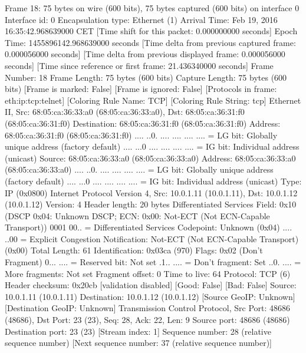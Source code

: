 Frame 18: 75 bytes on wire (600 bits), 75 bytes captured (600 bits) on interface 0
    Interface id: 0
    Encapsulation type: Ethernet (1)
    Arrival Time: Feb 19, 2016 16:35:42.968639000 CET
    [Time shift for this packet: 0.000000000 seconds]
    Epoch Time: 1455896142.968639000 seconds
    [Time delta from previous captured frame: 0.000056000 seconds]
    [Time delta from previous displayed frame: 0.000056000 seconds]
    [Time since reference or first frame: 21.436340000 seconds]
    Frame Number: 18
    Frame Length: 75 bytes (600 bits)
    Capture Length: 75 bytes (600 bits)
    [Frame is marked: False]
    [Frame is ignored: False]
    [Protocols in frame: eth:ip:tcp:telnet]
    [Coloring Rule Name: TCP]
    [Coloring Rule String: tcp]
Ethernet II, Src: 68:05:ca:36:33:a0 (68:05:ca:36:33:a0), Dst: 68:05:ca:36:31:f0 (68:05:ca:36:31:f0)
    Destination: 68:05:ca:36:31:f0 (68:05:ca:36:31:f0)
        Address: 68:05:ca:36:31:f0 (68:05:ca:36:31:f0)
        .... ..0. .... .... .... .... = LG bit: Globally unique address (factory default)
        .... ...0 .... .... .... .... = IG bit: Individual address (unicast)
    Source: 68:05:ca:36:33:a0 (68:05:ca:36:33:a0)
        Address: 68:05:ca:36:33:a0 (68:05:ca:36:33:a0)
        .... ..0. .... .... .... .... = LG bit: Globally unique address (factory default)
        .... ...0 .... .... .... .... = IG bit: Individual address (unicast)
    Type: IP (0x0800)
Internet Protocol Version 4, Src: 10.0.1.11 (10.0.1.11), Dst: 10.0.1.12 (10.0.1.12)
    Version: 4
    Header length: 20 bytes
    Differentiated Services Field: 0x10 (DSCP 0x04: Unknown DSCP; ECN: 0x00: Not-ECT (Not ECN-Capable Transport))
        0001 00.. = Differentiated Services Codepoint: Unknown (0x04)
        .... ..00 = Explicit Congestion Notification: Not-ECT (Not ECN-Capable Transport) (0x00)
    Total Length: 61
    Identification: 0x03ca (970)
    Flags: 0x02 (Don't Fragment)
        0... .... = Reserved bit: Not set
        .1.. .... = Don't fragment: Set
        ..0. .... = More fragments: Not set
    Fragment offset: 0
    Time to live: 64
    Protocol: TCP (6)
    Header checksum: 0x20cb [validation disabled]
        [Good: False]
        [Bad: False]
    Source: 10.0.1.11 (10.0.1.11)
    Destination: 10.0.1.12 (10.0.1.12)
    [Source GeoIP: Unknown]
    [Destination GeoIP: Unknown]
Transmission Control Protocol, Src Port: 48686 (48686), Dst Port: 23 (23), Seq: 28, Ack: 22, Len: 9
    Source port: 48686 (48686)
    Destination port: 23 (23)
    [Stream index: 1]
    Sequence number: 28    (relative sequence number)
    [Next sequence number: 37    (relative sequence number)]
